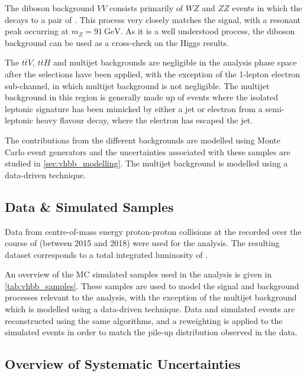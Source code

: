 The diboson background $VV$ consists primarily of $WZ$ and $ZZ$ events in which the \Zboson decays to a pair of \bquarks.
This process very closely matches the signal, with a resonant peak occurring at $m_Z = \SI{91}{\GeV}$.
As it is a well understood process, the diboson background can be used as a cross-check on the Higgs results.

The $t\overline{t} V$, $t\overline{t} H$ and multijet backgrounds are negligible in the analysis phase space after the selections have been applied, with the exception of the 1-lepton electron sub-channel, in which multijet background is not negligible.
The multijet background in this region is generally made up of events where the isolated leptonic signature has been mimicked by either a jet or electron from a semi-leptonic heavy flavour decay, where the electron has escaped the jet.

The contributions from the different backgrounds are modelled using Monte Carlo event generators and the uncertainties associated with these samples are studied in \cref{sec:vhbb_modelling}.
The multijet background is modelled using a data-driven technique.


\subsection{Data \& Simulated Samples}\label{sec:vhbb_samples}

Data from centre-of-mass energy  proton-proton collisions at the \LHC recorded over the course of \runtwo (between 2015 and 2018) were used for the analysis.
The resulting dataset corresponds to a total integrated luminosity of \intlumi.

An overview of the MC simulated samples used in the analysis is given in \cref{tab:vhbb_samples}.
These samples are used to model the signal and background processes relevant to the analysis, with the exception of the multijet background which is modelled using a data-driven technique.
Data and simulated events are reconstructed using the same algorithms, and a reweighting is applied to the simulated events in order to match the pile-up distribution observed in the data.
%

%

\subsection{Overview of Systematic Uncertainties}\label{sec:systematic_uncertainties}

